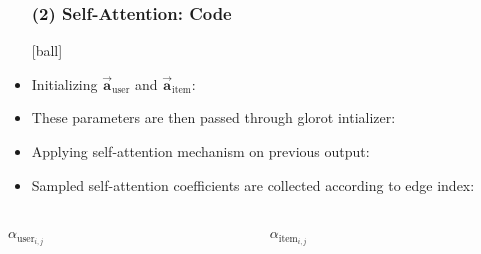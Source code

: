 \documentclass{beamer}
\begin{document}
\begin{frame}[fragile]
\begin{itemize}
\frametitle{(2) Self-Attention: Code}
[ball]

\item Initializing $\overrightarrow{\mathbf{a}}_{\text{user}}$ and $\overrightarrow{\mathbf{a}}_{\text{item}}$:



\item These parameters are then passed through glorot intializer:



\item Applying self-attention mechanism on previous output:



\end{itemize}
\end{frame}


\begin{frame}[fragile]
\begin{itemize}
\frametitle{(2) Self-Attention: Code}
[ball]

\item Sampled self-attention coefficients are collected according to edge index:

\end{itemize}

\vspace{0.3cm}

\begin{columns}
\begin{column}{0.5\textwidth}
\hspace{2cm} $\alpha_{\text{user}_{i,j}}$

\end{column}
\begin{column}{0.5\textwidth}
\hspace{2cm} $\alpha_{\text{item}_{i,j}}$

\end{column}
\end{columns}

\end{frame}
\end{document}
